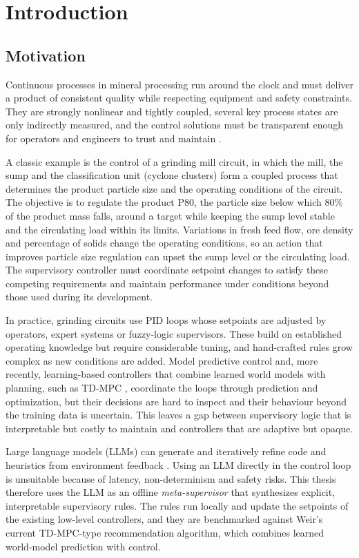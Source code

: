 \chapter{Introduction}
\label{ch:introduction}

\section{Motivation}
Continuous processes in mineral processing run around the clock and must
deliver a product of consistent quality while respecting equipment and
safety constraints. They are strongly nonlinear and tightly coupled, several
key process states are only indirectly measured, and the control solutions
must be transparent enough for operators and engineers to trust and
maintain \cite{pomerleau2000}.

A classic example is the control of a grinding mill circuit, in which the
mill, the sump and the classification unit (cyclone clusters) form a coupled
process that determines the product particle size and the operating
conditions of the circuit. The objective is to regulate the product P80,
the particle size below which 80\% of the product mass falls, around a
target while keeping the sump level stable and the circulating load within
its limits. Variations in fresh feed flow, ore density and percentage of
solids change the operating conditions, so an action that improves particle
size regulation can upset the sump level or the circulating load. The
supervisory controller must coordinate setpoint changes to satisfy these
competing requirements and maintain performance under conditions beyond
those used during its development.

In practice, grinding circuits use PID loops whose setpoints are adjusted by
operators, expert systems or fuzzy-logic supervisors. These build on
established operating knowledge but require considerable tuning, and
hand-crafted rules grow complex as new conditions are added. Model
predictive control and, more recently, learning-based controllers that
combine learned world models with planning, such as TD-MPC
\cite{hansen2022tdmpc,hansen2024tdmpc2}, coordinate the loops through
prediction and optimization, but their decisions are hard to inspect and
their behaviour beyond the training data is uncertain. This leaves a gap
between supervisory logic that is interpretable but costly to maintain and
controllers that are adaptive but opaque.

Large language models (LLMs) can generate and iteratively refine code and
heuristics from environment feedback
\cite{romeraparedes2024funsearch,novikov2025alphaevolve,ma2024eureka,hatgiskessell2026promptpo,weng2026lbg}.
Using an LLM directly in the control loop is unsuitable because of latency,
non-determinism and safety risks. This thesis therefore uses the LLM as an
offline \emph{meta-supervisor} that synthesizes explicit, interpretable
supervisory rules. The rules run locally and update the setpoints of the
existing low-level controllers, and they are benchmarked against Weir's
current TD-MPC-type recommendation algorithm, which combines learned
world-model prediction with control.

